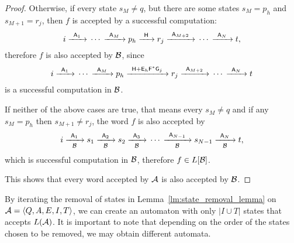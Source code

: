 \begin{proof}
    Otherwise, if every state $s_M \neq q$, but there are some states $s_M = p_h$ and $s_{M+1} = r_j$, then $f$ is accepted by a successful computation:
    \[
        i {\; \xrightarrow[]{\: \; {\mathsf{A}}_1 \: \;} \;} \dotsm {\; \xrightarrow[]{\: \; {\mathsf{A}}_M \: \;} \;} p_h {\; \xrightarrow[]{\: \; {\mathsf{H}} \: \;} \;} r_j {\; \xrightarrow[]{\: \; {\mathsf{A}}_{M+2} \: \;} \;} \dotsm {\; \xrightarrow[]{\: \; {\mathsf{A}}_N \: \;} \;} t,
    \]
    therefore $f$ is also accepted by ${\mathcal{B}}$, since
    \[
        i {\; \xrightarrow[]{\: \; {\mathsf{A}}_1 \: \;} \;} \dotsm {\; \xrightarrow[]{\: \; {\mathsf{A}}_M \: \;} \;} p_h {\; \xrightarrow[]{\: \; {\mathsf{H}} + {\mathsf{E}}_h{\mathsf{F}}^*{\mathsf{G}}_j \: \;} \;} r_j {\; \xrightarrow[]{\: \; {\mathsf{A}}_{M+2} \: \;} \;} \dotsm {\; \xrightarrow[]{\: \; {\mathsf{A}}_N \: \;} \;} t
    \]
    is a successful computation in ${\mathcal{B}}$.

    If neither of the above cases are true, that means every $s_M \neq q$ and if any $s_M = p_h$ then $s_{M+1} \neq r_j$, the word $f$ is also accepted by
    \[
        i {\; \xrightarrow[{\mathcal{B}}]{\: \; {\mathsf{A}}_1 \: \;} \;} s_1 {\; \xrightarrow[{\mathcal{B}}]{\: \; {\mathsf{A}}_2 \: \;} \;} s_2 {\; \xrightarrow[{\mathcal{B}}]{\: \; {\mathsf{A}}_3 \: \;} \;} \dotsm {\; \xrightarrow[{\mathcal{B}}]{\: \; {\mathsf{A}}_{N-1} \: \;} \;} s_{N-1} {\; \xrightarrow[{\mathcal{B}}]{\: \; {\mathsf{A}}_N \: \;} \;} t,
    \]
    which is successful computation in ${\mathcal{B}}$, therefore $f \in L[{\mathcal{B}}]$.

    This shows that every word accepted by ${\mathcal{A}}$ is also accepted by ${\mathcal{B}}$.
\end{proof}

By iterating the removal of states in Lemma~\ref*{lm:state_removal_lemma} on ${\mathcal{A}} = \langle Q, A, E, I, T \rangle$, we can create an automaton with only $|I \cup T|$ states that accepts $L({\mathcal{A}})$. It is important to note that depending on the order of the states chosen to be removed, we may obtain different automata.